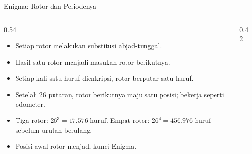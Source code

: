 \documentclass[aspectratio=169,11pt]{beamer}
\begin{document}
\begin{frame}{Enigma: Rotor dan Periodenya}
    \begin{columns}[T,onlytextwidth]
        \begin{column}{0.54\textwidth}
            \footnotesize
            \begin{itemize}
                \item Setiap rotor melakukan substitusi abjad-tunggal.
                \item Hasil satu rotor menjadi masukan rotor berikutnya.
                \item Setiap kali satu huruf dienkripsi, rotor berputar satu
                      huruf.
                \item Setelah 26 putaran, rotor berikutnya maju satu posisi;
                      bekerja seperti odometer.
                \item Tiga rotor: $26^3=17.576$ huruf. Empat rotor:
                      $26^4=456.976$ huruf sebelum urutan berulang.
                \item Posisi awal rotor menjadi kunci Enigma.
            \end{itemize}
        \end{column}
        \begin{column}{0.42\textwidth}
            \centering
        \end{column}
    \end{columns}
\end{frame}
\end{document}
